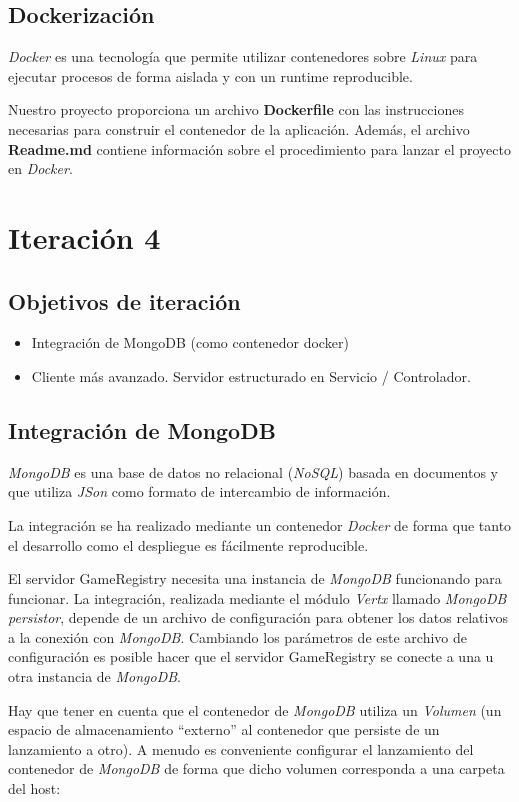 \documentclass[12pt,a4paper]{report}
\begin{document}
\section{Dockerización}
\emph{Docker} es una tecnología que permite utilizar contenedores sobre \emph{Linux} para
ejecutar procesos de forma aislada y con un runtime reproducible.

Nuestro proyecto proporciona un archivo \textbf{Dockerfile} con las instrucciones necesarias
para construir el contenedor de la aplicación. Además, el archivo \textbf{Readme.md} contiene
información sobre el procedimiento para lanzar el proyecto en \emph{Docker}.

\chapter{Iteración 4}
\section{Objetivos de iteración}
\begin{itemize}
  \item Integración de MongoDB (como contenedor docker) 
  \item Cliente más avanzado. Servidor estructurado en Servicio / Controlador.
\end{itemize}

\section{Integración de MongoDB}
\emph{MongoDB} es una base de datos no relacional (\emph{NoSQL}) basada en documentos y
que utiliza \emph{JSon} como formato de intercambio de información.

La integración se ha realizado mediante un contenedor \emph{Docker} de forma que tanto el
desarrollo como el despliegue es fácilmente reproducible.

El servidor GameRegistry necesita una instancia de \emph{MongoDB} funcionando para funcionar.
La integración, realizada mediante el módulo \emph{Vertx} llamado \emph{MongoDB persistor}, depende
de un archivo de configuración para obtener los datos relativos a la conexión con \emph{MongoDB}.
Cambiando los parámetros de este archivo de configuración es posible hacer que el servidor
GameRegistry se conecte a una u otra instancia de \emph{MongoDB}.

Hay que tener en cuenta que el contenedor de \emph{MongoDB} utiliza un \emph{Volumen} (un espacio
de almacenamiento ``externo'' al contenedor que persiste de un lanzamiento a otro). A menudo es
conveniente configurar el lanzamiento del contenedor de \emph{MongoDB} de forma que dicho volumen
corresponda a una carpeta del host:
\end{document}
